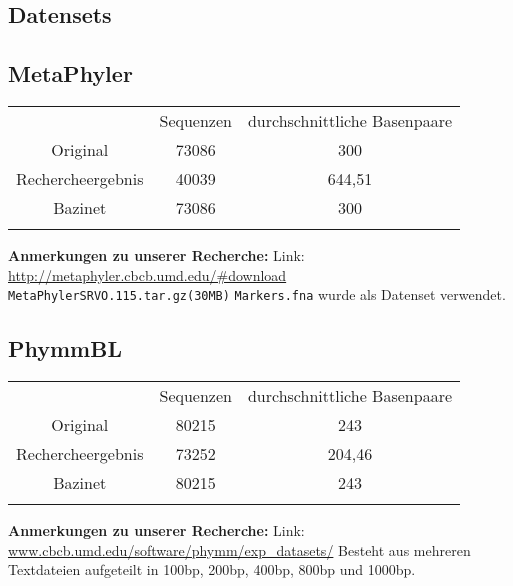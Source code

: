 \documentclass[a4paper, 11pt]{scrartcl}
\begin{document}
\begin{flushleft}


\section{Datensets}


\subsection{MetaPhyler}

\begin{tabular}{ccc}
& Sequenzen & durchschnittliche Basenpaare\\
Original&73086&300\\
Rechercheergebnis&40039&644,51\\
Bazinet&73086&300\\
&&\\
\end{tabular}
\linebreak
\color{red}
\textbf{Anmerkungen zu unserer Recherche:}\linebreak
Link: \url{http://metaphyler.cbcb.umd.edu/#download}
\linebreak
\texttt{MetaPhylerSRVO.115.tar.gz(30MB)}
\linebreak
\texttt{Markers.fna} wurde als Datenset verwendet.
\color{black}
\subsection{PhymmBL}

\begin{tabular}{ccc}
& Sequenzen & durchschnittliche Basenpaare \\
Original&80215&243\\
Rechercheergebnis&73252&204,46\\
Bazinet&80215&243\\
&&\\
\end{tabular}
\linebreak
\color{red}
\textbf{Anmerkungen zu unserer Recherche:}\linebreak
Link: \url{www.cbcb.umd.edu/software/phymm/exp_datasets/}
\linebreak
Besteht aus mehreren Textdateien aufgeteilt in 100bp, 200bp, 400bp, 800bp und 1000bp.
\color{black}


\end{flushleft}
\end{document}
